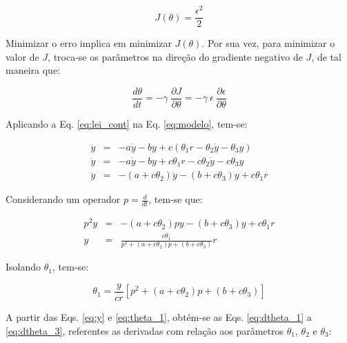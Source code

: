 \begin{equation}
J(\theta) = \frac{\epsilon^2}{2}
\end{equation}

Minimizar o erro implica em minimizar $J(\theta)$. Por sua vez, para minimizar o
valor de $J$, troca-se os parâmetros na direção do gradiente negativo de $J$, de
tal maneira que:

\begin{equation}\label{eq:J}
\frac{d\theta}{dt} = -\gamma\ \frac{\partial J}{\partial \theta} = 
                     -\gamma\ \epsilon\ \frac{\partial \epsilon}
                                             {\partial \theta}
\end{equation}

Aplicando a Eq. \ref{eq:lei_cont} na Eq. \ref{eq:modelo}, tem-se:

\begin{eqnarray}
\ddot{y} & = & -a\dot{y} - by + c \left( \theta_1r - 
                                         \theta_2\dot{y} - 
                                         \theta_3y\right)\nonumber\\
\ddot{y} & = & -a\dot{y} - by + c\theta_1r - 
                                c\theta_2\dot{y} -
                                c\theta_3y\nonumber\\
\ddot{y} & = & -(a + c\theta_2)\dot{y} - (b + c\theta_3)y + c\theta_1r\nonumber
\end{eqnarray}

Considerando um operador $p = \frac{d}{dt}$, tem-se que:

\begin{eqnarray}
p^2y & = & - (a + c\theta_2)py - 
             (b + c\theta_3)y + 
             c\theta_1r\nonumber\\
y & = & \frac{c\theta_1}{p^2 + 
                         (a + c\theta_2)p + 
                         (b + c\theta_3)}r\label{eq:y}
\end{eqnarray}

Isolando $\theta_1$, tem-se:

\begin{equation}\label{eq:theta_1}
\theta_1 = \frac{y}{cr}\left[ p^2 + (a + c\theta_2)p + (b + c\theta_3) \right]
\end{equation}

A partir das Eqs. \ref{eq:y} e \ref{eq:theta_1}, obtém-se as Eqs.
\ref{eq:dtheta_1} a \ref{eq:dtheta_3}, referentes as derivadas com relação aos
parâmetros $\theta_1$, $\theta_2$ e $\theta_3$:

